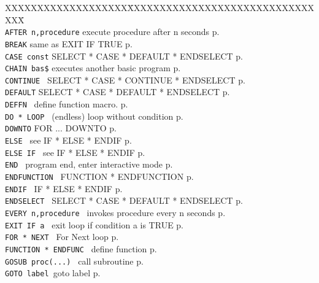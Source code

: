 \begin{tabbing}
XXXXXXXXXXXXXXXXXXX\=XXXXXXXXXXXXXXXXXXXXXXXXXXXXXXXX\=\kill\\
\verb|AFTER n,procedure|\> execute procedure after n seconds  \> p.\pageref{AFTER}\\
\verb|BREAK|           \> same as EXIT IF TRUE               \> p.\pageref{BREAK}\\
\verb|CASE const|      \> SELECT * CASE * DEFAULT * ENDSELECT\> p.\pageref{CASE}\\
{\tt CHAIN bas\$}\> executes another basic program           \> p.\pageref{CHAIN}\\
\verb|CONTINUE | \> SELECT * CASE * CONTINUE * ENDSELECT     \> p.\pageref{CONTINUE}\\
\verb|DEFAULT| 	 \> SELECT * CASE * DEFAULT * ENDSELECT      \> p.\pageref{DEFAULT}\\
\verb|DEFFN |    \> define function macro.                   \> p.\pageref{DEFFN} \\
{\tt DO * LOOP	}\> (endless) loop without condition         \> p.\pageref{DO}\\
\verb|DOWNTO|    \> FOR ... DOWNTO                   \> p.\pageref{DOWNTO} \\
{\tt ELSE		}\> see IF * ELSE * ENDIF            \> p.\pageref{ELSE}\\
{\tt ELSE IF	}\> see IF * ELSE * ENDIF            \> p.\pageref{ELSEbIF}\\
{\tt END		}\> program end, enter interactive mode\> p.\pageref{END}\\
{\tt ENDFUNCTION	}\> FUNCTION * ENDFUNCTION           \> p.\pageref{ENDFUNCTION}\\
{\tt ENDIF		}\> IF * ELSE * ENDIF                \> p.\pageref{ENDIF}\\
{\tt ENDSELECT		}\> SELECT * CASE * DEFAULT * ENDSELECT\> p.\pageref{ENDSELECT}\\
{\tt EVERY n,procedure	}\> invokes procedure every n seconds\> p.\pageref{EVERY}\\
{\tt EXIT IF a		}\> exit loop if condition a is TRUE \> p.\pageref{EXITbIF}\\
{\tt FOR * NEXT		}\> For Next loop                    \> p.\pageref{FOR}\\
{\tt FUNCTION * ENDFUNC	}\> define function                  \> p.\pageref{FUNCTION}\\
{\tt GOSUB proc(...) }   \> call subroutine                  \> p.\pageref{GOSUBbABBREVpba}\\
{\tt GOTO label		}\>goto label                        \> p.\pageref{GOTO}\\

\end{tabbing}
